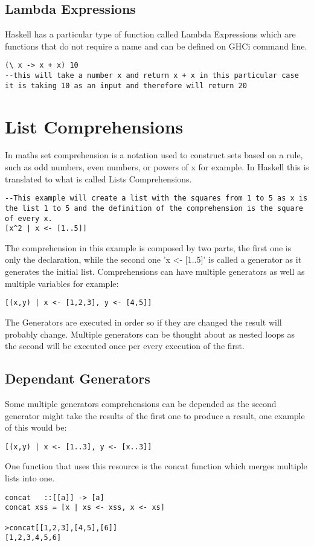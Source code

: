 \documentclass[12pt, oneside]{article}
\begin{document}
\subsection{Lambda Expressions}
Haskell has a particular type of function called Lambda Expressions which are functions that do not require a name and can be defined on GHCi command line.
\begin{lstlisting}
(\ x -> x + x) 10
--this will take a number x and return x + x in this particular case it is taking 10 as an input and therefore will return 20
\end{lstlisting}
\section{List Comprehensions}
In maths set comprehension is a notation used to construct sets based on a rule, such as odd numbers, even numbers, or powers of x for example. In Haskell this is translated to what is called Lists Comprehensions.
\begin{lstlisting}
--This example will create a list with the squares from 1 to 5 as x is the list 1 to 5 and the definition of the comprehension is the square of every x.
[x^2 | x <- [1..5]]
\end{lstlisting}
The comprehension in this example is composed by two parts, the first one is only the declaration, while the second one 'x <- [1..5]' is called a generator as it generates the initial list. Comprehensions can have multiple generators as well as multiple variables for example:
\begin{lstlisting}
[(x,y) | x <- [1,2,3], y <- [4,5]]
\end{lstlisting}
The Generators are executed in order so if they are changed the result will probably change. Multiple generators can be thought about as nested loops as the second will be executed once per every execution of the first.
\subsection{Dependant Generators}
Some multiple generators comprehensions can be depended as the second generator might take the results of the first one to produce a result, one example of this would be:
\begin{lstlisting}
[(x,y) | x <- [1..3], y <- [x..3]]
\end{lstlisting}
One function that uses this resource is the concat function which merges multiple lists into one.
\begin{lstlisting}
concat   ::[[a]] -> [a]
concat xss = [x | xs <- xss, x <- xs]

>concat[[1,2,3],[4,5],[6]]
[1,2,3,4,5,6]
\end{lstlisting}
\end{document}
